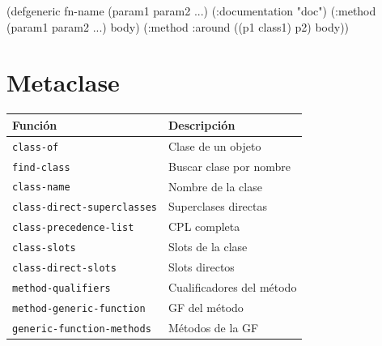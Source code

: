 \begin{lispcode}
(defgeneric fn-name (param1 param2 ...)
  (:documentation "doc")
  (:method (param1 param2 ...) body)
  (:method :around ((p1 class1) p2) body))
\end{lispcode}

\section*{Metaclase}

\begin{center}
\begin{tabular}{ll}
\toprule
\textbf{Función} & \textbf{Descripción} \\
\midrule
\texttt{class-of} & Clase de un objeto \\
\texttt{find-class} & Buscar clase por nombre \\
\texttt{class-name} & Nombre de la clase \\
\texttt{class-direct-superclasses} & Superclases directas \\
\texttt{class-precedence-list} & CPL completa \\
\texttt{class-slots} & Slots de la clase \\
\texttt{class-direct-slots} & Slots directos \\
\texttt{method-qualifiers} & Cualificadores del método \\
\texttt{method-generic-function} & GF del método \\
\texttt{generic-function-methods} & Métodos de la GF \\
\bottomrule
\end{tabular}
\end{center}

